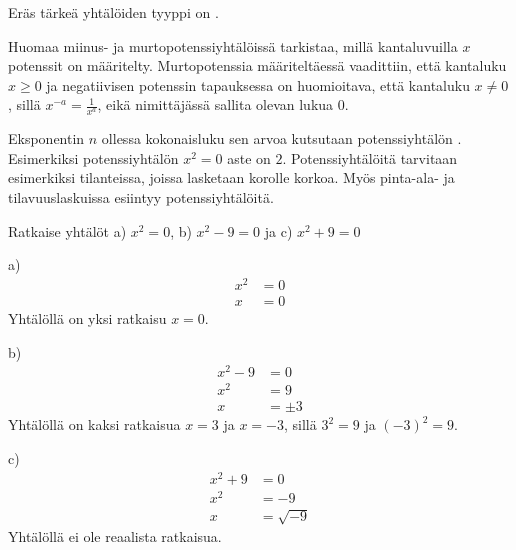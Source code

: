 Eräs tärkeä yhtälöiden tyyppi on .

Huomaa miinus- ja murtopotenssiyhtälöissä tarkistaa, millä kantaluvuilla $x$ potenssit on määritelty. Murtopotenssia määriteltäessä vaadittiin, että kantaluku $x\geq0$ ja negatiivisen potenssin tapauksessa on huomioitava, että kantaluku $x\neq0$, sillä $x^{-a}=\frac{1}{x^a}$, eikä nimittäjässä sallita olevan lukua $0$.

Eksponentin $n$ ollessa kokonaisluku sen arvoa kutsutaan potenssiyhtälön . Esimerkiksi potenssiyhtälön $x^2=0$ aste on $2$. Potenssiyhtälöitä tarvitaan esimerkiksi tilanteissa, joissa lasketaan korolle korkoa. Myös pinta-ala- ja tilavuuslaskuissa esiintyy potenssiyhtälöitä.


\begin{esimerkki}
Ratkaise yhtälöt a) $x^2 = 0$, b) $x^2 - 9 = 0$ ja c) $x^2 + 9 = 0$

a)	\begin{align*}
	x^2 &= 0 \\
	x &= 0
	\end{align*}
	Yhtälöllä on yksi ratkaisu $x = 0$.

b)	\begin{align*}
	x^2 - 9 &= 0 \\
	x^2 &= 9 \\
	x &= \pm 3
	\end{align*}
	Yhtälöllä on kaksi ratkaisua $x = 3$ ja $x = -3$, sillä $3^2 = 9$ ja $(-3)^2 = 9$.

c)	\begin{align*}
	x^2 + 9 &= 0 \\
	x^2 &= -9 \\
	x &= \sqrt{-9}
	\end{align*}
	Yhtälöllä ei ole reaalista ratkaisua.

\end{esimerkki}

